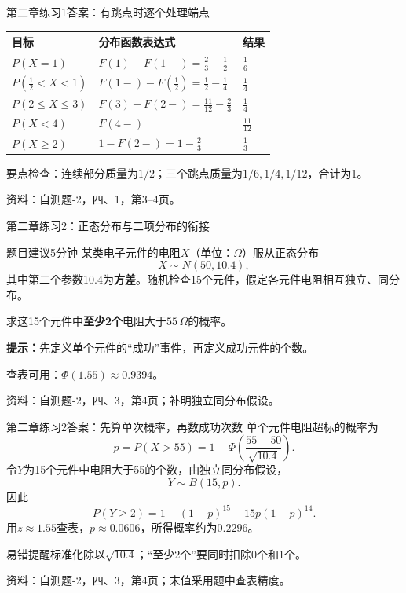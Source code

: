 \documentclass[aspectratio=169,10pt]{beamer}
\newcommand{\source}[1]{\vfill{\color{Muted}\fontsize{6.5}{8}\selectfont 资料：#1\par}}
\newcommand{\key}[1]{\begin{block}{要点}#1\end{block}}
\newcommand{\warn}[1]{\begin{alertblock}{易错提醒}#1\end{alertblock}}
\begin{document}
\begin{answerframe}{第二章练习1答案：有跳点时逐个处理端点}
\renewcommand{\arraystretch}{1.5}
\begin{center}
\begin{tabular}{lll}
\toprule
目标 & 分布函数表达式 & 结果\\\midrule
$P(X=1)$ & $F(1)-F(1-)=\frac23-\frac12$ & {\color{Teal}$\tfrac16$}\\
$P(\frac12<X<1)$ & $F(1-)-F(\frac12)=\frac12-\frac14$ & {\color{Teal}$\tfrac14$}\\
$P(2\le X\le3)$ & $F(3)-F(2-)=\frac{11}{12}-\frac23$ & {\color{Teal}$\tfrac14$}\\
$P(X<4)$ & $F(4-)$ & {\color{Teal}$\tfrac{11}{12}$}\\
$P(X\ge2)$ & $1-F(2-)=1-\frac23$ & {\color{Teal}$\tfrac13$}\\\bottomrule
\end{tabular}
\end{center}
\key{检查：连续部分质量为$1/2$；三个跳点质量为$1/6,1/4,1/12$，合计为1。}
\source{自测题-2，四、1，第3--4页。}
\end{answerframe}

\begin{frame}[t]{第二章练习2：正态分布与二项分布的衔接}
\begin{block}{题目\quad 建议5分钟}
某类电子元件的电阻$X$（单位：$\Omega$）服从正态分布
\[
X\sim N(50,10.4),
\]
其中第二个参数10.4为\textbf{方差}。随机检查15个元件，假定各元件电阻相互独立、同分布。

求这15个元件中\textbf{至少2个}电阻大于$55\,\Omega$的概率。
\end{block}
\textbf{提示：}先定义单个元件的“成功”事件，再定义成功元件的个数。

查表可用：$\Phi(1.55)\approx0.9394$。
\source{自测题-2，四、3，第4页；补明独立同分布假设。}
\end{frame}

\begin{answerframe}{第二章练习2答案：先算单次概率，再数成功次数}
单个元件电阻超标的概率为
\[
p=P(X>55)=1-\Phi\!\left(\frac{55-50}{\sqrt{10.4}}\right).
\]
令$Y$为15个元件中电阻大于55的个数，由独立同分布假设，
\[
Y\sim B(15,p).
\]
因此
\[
\boxed{P(Y\ge2)=1-(1-p)^{15}-15p(1-p)^{14}}.
\]
用$z\approx1.55$查表，$p\approx0.0606$，所得概率约为$\boxed{0.2296}$。
\warn{标准化除以$\sqrt{10.4}$；“至少2个”要同时扣除0个和1个。}
\source{自测题-2，四、3，第4页；末值采用题中查表精度。}
\end{answerframe}
\end{document}

